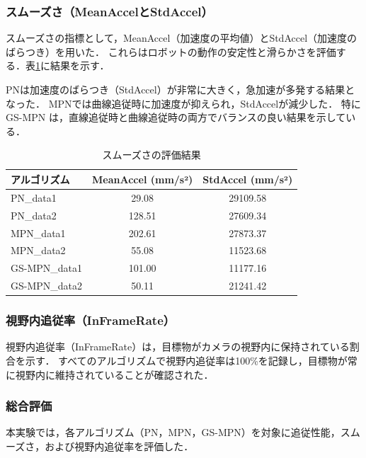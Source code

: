 \subsubsection{スムーズさ（MeanAccelとStdAccel）}
スムーズさの指標として，MeanAccel（加速度の平均値）とStdAccel（加速度のばらつき）を用いた．
これらはロボットの動作の安定性と滑らかさを評価する．表\ref{tab:accel_results}に結果を示す．

PNは加速度のばらつき（StdAccel）が非常に大きく，急加速が多発する結果となった．
MPNでは曲線追従時に加速度が抑えられ，StdAccelが減少した．
特に GS-MPN は，直線追従時と曲線追従時の両方でバランスの良い結果を示している．

\begin{table}[H]
    \centering
    \caption{スムーズさの評価結果}
    \label{tab:accel_results}
    \begin{tabular}{|l|c|c|}
        \hline
        \textbf{アルゴリズム} & \textbf{MeanAccel (mm/s²)} & \textbf{StdAccel (mm/s²)} \\ \hline
        PN\_data1             & 29.08                      & 29109.58                  \\ \hline
        PN\_data2             & 128.51                     & 27609.34                  \\ \hline
        MPN\_data1            & 202.61                     & 27873.37                  \\ \hline
        MPN\_data2            & 55.08                      & 11523.68                  \\ \hline
        GS-MPN\_data1         & 101.00                     & 11177.16                  \\ \hline
        GS-MPN\_data2         & 50.11                      & 21241.42                  \\ \hline
    \end{tabular}
\end{table}

\subsubsection{視野内追従率（InFrameRate）}
視野内追従率（InFrameRate）は，目標物がカメラの視野内に保持されている割合を示す．
すべてのアルゴリズムで視野内追従率は100\%を記録し，目標物が常に視野内に維持されていることが確認された．

\subsubsection{総合評価}
本実験では，各アルゴリズム（PN，MPN，GS-MPN）を対象に追従性能，スムーズさ，および視野内追従率を評価した．

